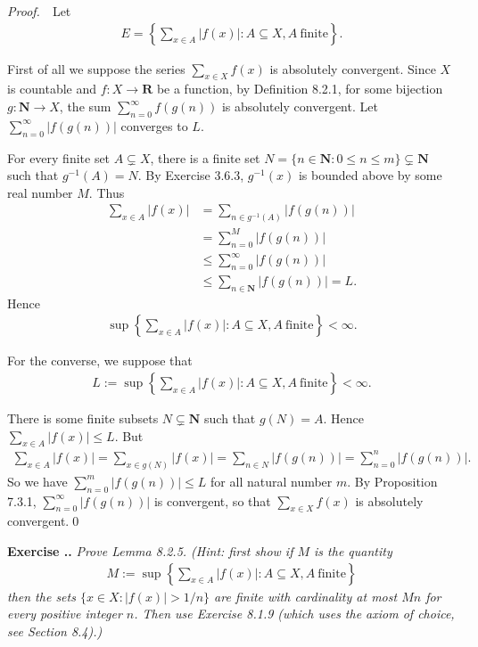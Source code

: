 \documentclass{book}
\newcommand{\pff}{\vspace{.25em}\noindent\emph{Proof.}~~}
\newcounter{Exercise}[section]
\renewcommand{\theExercise}{\thesection.\arabic{Exercise}.}
\newcommand{\new}{\vspace{1.5em}\noindent\textbf{{Exercise \stepcounter{Exercise}\textbf{\theExercise}}} }
\begin{document}
\pff Let
    \begin{align*}
        E=\left\{\sum_{x\in A}|f(x)|:A\subseteq X,A\ \textrm{finite}\right\}.
    \end{align*}

First of all we suppose the series $\sum_{x\in X}f(x)$ is absolutely convergent. Since $X$ is countable and $f:X\to\mathbf{R}$ be a function, by Definition 8.2.1, for some bijection $g:\mathbf{N}\to X$, the sum $\sum_{n=0}^\infty f(g(n))$ is absolutely convergent. Let $\sum_{n=0}^\infty|f(g(n))|$ converges to $L$.

For every finite set $A\subsetneq X$, there is a finite set $N=\{n\in\mathbf{N}:0\leq n\leq m\}\subsetneq\mathbf{N}$ such that $g^{-1}(A)=N$. By Exercise 3.6.3, $g^{-1}(x)$ is bounded above by some real number $M$. Thus
    \begin{align*}
        \sum_{x\in A}|f(x)|
        &=\sum_{n\in g^{-1}(A)}|f(g(n))|\\
        &=\sum_{n=0}^{M}|f(g(n))|\\
        &\leq\sum_{n=0}^{\infty}|f(g(n))|\\
        &\leq\sum_{n\in\mathbf{N}}|f(g(n))|=L.
    \end{align*}
Hence
    \begin{align*}
        \sup\left\{\sum_{x\in A}|f(x)|:A\subseteq X,A\ \textrm{finite}\right\}<\infty.
    \end{align*}

For the converse, we suppose that
    \begin{align*}
        L:=\sup\left\{\sum_{x\in A}|f(x)|:A\subseteq X,A\ \textrm{finite}\right\}<\infty.
    \end{align*}

There is some finite subsets $N\subsetneq\mathbf{N}$ such that $g(N)=A$. Hence $\sum_{x\in A}|f(x)|\leq L$. But
    \begin{align*}
        \sum_{x\in A}|f(x)|=\sum_{x\in g(N)}|f(x)|=\sum_{n\in N}|f(g(n))|=\sum_{n=0}^{n}|f(g(n))|.
    \end{align*}
So we have $\sum_{n=0}^{m}|f(g(n))|\leq L$ for all natural number $m$. By Proposition 7.3.1, $\sum_{n=0}^{\infty}|f(g(n))|$ is convergent, so that $\sum_{x\in X}f(x)$ is absolutely convergent.\qed

\new\emph{Prove Lemma 8.2.5. (Hint: first show if $M$ is the quantity}
    \begin{align*}
        M:=\sup\left\{\sum_{x\in A}|f(x)|:A\subseteq X,A\ \textrm{finite}\right\}
    \end{align*}
\emph{then the sets $\{x\in X:|f(x)|>1/n\}$ are finite with cardinality at most $Mn$ for every positive integer $n$. Then use Exercise 8.1.9 (which uses the axiom of choice, see Section 8.4).)}
\end{document}
